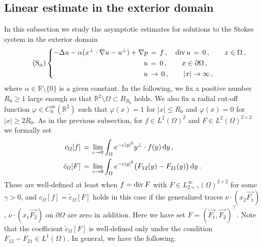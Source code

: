 \documentclass[11pt,a4paper]{article}
\newcommand{\R}{\mathbb{R}}
\newcommand{\dd}{\,{\rm d}}
\begin{document}












\subsection{Linear estimate in the exterior domain}\label{subsec.linear.exterior}

In this subsection we study the asymptotic estimates for solutions to the Stokes system in the exterior domain
%
\begin{equation}\tag{S$_{\alpha}$}\label{Sa}
  \left\{\begin{aligned}
  -\Delta u - \alpha ( x^\bot \cdot \nabla u - u^\bot ) + \nabla p  &\,=\, f \,, 
  \quad {\rm div}\, u \,=\, 0\,,  ~~~~~~   x \in \Omega\,, \\
 u  & \, =\,  0   \,,  ~~~~~~ x\in \partial\Omega\,, \\
 u  & \, \rightarrow \,     0   \,,  ~~~~~~ |x| \rightarrow \infty\,,
\end{aligned}\right.
\end{equation}
%
where $\alpha \in \R\setminus \{0\}$ is a given constant. In the following,
we fix a positive number $R_0\geq 1$ large enough so that $\R^2\setminus \Omega\subset B_{R_0}$ holds. 
We also fix a radial cut-off function $\varphi\in C_0^\infty (\R^2)$ such that $\varphi (x)=1$ for $|x|\leq R_0$ and $\varphi (x) =0$ for $|x|\geq 2R_0$. As in the previous subsection, for $f\in L^2(\Omega)^2$ and $F\in L^2 (\Omega)^{2\times 2}$ we formally set 
%
\begin{align}
\begin{split}
c_\Omega [f] & \, = \, 
\lim_{\epsilon \rightarrow 0} \int_{\Omega} e^{-\epsilon |y|^2} y^\bot \cdot f(y) \dd y\,,\label{def.c.tildec.exterior}\\
\tilde c_\Omega [F] & \, = \, 
\lim_{\epsilon \rightarrow 0} \int_{\Omega} e^{-\epsilon |y|^2} \big(F_{12}(y) - F_{21}(y) \big)\dd y\,.
\end{split}
\end{align}
%
These are well-defined at least when $f={\rm div}\, F$ with $F\in L^\infty_{2+\gamma} (\Omega)^{2\times 2}$ for some $\gamma>0$, and $c_\Omega [f]=\tilde c_\Omega [F]$ holds in this case if the generalized traces $\nu \cdot (x_2 \vec{F_1})$, $\nu \cdot (x_1 \vec{F_2})$ on $\partial\Omega$ are zero in addition. Here we have set $F=(\vec{F_1}, \vec{F_2})^\top$. Note that the coefficient $\tilde c_\Omega[F]$ is well-defined only under the condition $F_{12}-F_{21}\in L^1 (\Omega)$. In general, we have the following.
\end{document}
